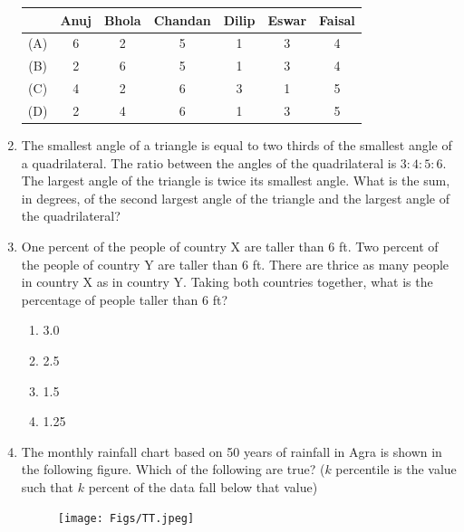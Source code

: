 \documentclass[journal]{IEEEtran}
\begin{document}
\begin{enumerate}
\begin{center}
\begin{tabular}{|c|c|c|c|c|c|c|}
\hline
 & Anuj & Bhola & Chandan & Dilip & Eswar & Faisal \\
\hline
(A) & 6 & 2 & 5 & 1 & 3 & 4 \\
\hline
(B) & 2 & 6 & 5 & 1 & 3 & 4 \\
\hline
(C) & 4 & 2 & 6 & 3 & 1 & 5 \\
\hline
(D) & 2 & 4 & 6 & 1 & 3 & 5 \\
\hline
\end{tabular}
\end{center}
\hfill{}

\item The smallest angle of a triangle is equal to two thirds of the smallest angle of a quadrilateral. The ratio between the angles of the quadrilateral is $3 : 4 : 5 : 6$. The largest angle of the triangle is twice its smallest angle. What is the sum, in degrees, of the second largest angle of the triangle and the largest angle of the quadrilateral?

\hfill{}


\item One percent of the people of country X are taller than 6 ft. Two percent of the people of country Y are taller than 6 ft. There are thrice as many people in country X as in country Y. Taking both countries together, what is the percentage of people taller than 6 ft?


\begin{enumerate}
    \item 3.0
    \item 2.5
    \item 1.5
    \item 1.25
\end{enumerate}
\hfill{}

\item The monthly rainfall chart based on 50 years of rainfall in Agra is shown in the following figure. Which of the following are true? (\(k\) percentile is the value such that \(k\) percent of the data fall below that value)

\begin{figure}[H]
\centering
\texttt{[image: Figs/TT.jpeg]}
\caption{}
\end{figure}

    \begin{enumerate}
        

\end{enumerate}
\end{enumerate}
\end{document}
